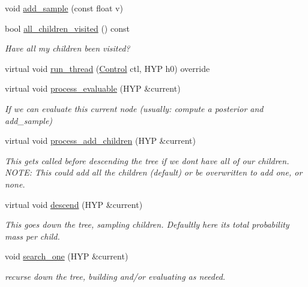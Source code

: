 \begin{DoxyCompactItemize}
\item 
void \hyperlink{class_full_m_c_t_s_node_a9c160f6b2732178bf7c2e32c125f4724}{add\+\_\+sample} (const float v)
\item 
bool \hyperlink{class_full_m_c_t_s_node_aea09f6d9b8a5adfe97c81f698b718560}{all\+\_\+children\+\_\+visited} () const
\begin{DoxyCompactList}\small\item\em Have all my children been visited? \end{DoxyCompactList}\item 
virtual void \hyperlink{class_full_m_c_t_s_node_acfdd0747aa1af7943995436a4aae1b26}{run\+\_\+thread} (\hyperlink{struct_control}{Control} ctl, H\+YP h0) override
\item 
virtual void \hyperlink{class_full_m_c_t_s_node_adc180cfd25b033b13ac048270fb51be7}{process\+\_\+evaluable} (H\+YP \&current)
\begin{DoxyCompactList}\small\item\em If we can evaluate this current node (usually\+: compute a posterior and add\+\_\+sample) \end{DoxyCompactList}\item 
virtual void \hyperlink{class_full_m_c_t_s_node_a10a7bbaae53e6b6ed71207ec80c1a620}{process\+\_\+add\+\_\+children} (H\+YP \&current)
\begin{DoxyCompactList}\small\item\em This gets called before descending the tree if we don\textquotesingle{}t have all of our children. N\+O\+TE\+: This could add all the children (default) or be overwritten to add one, or none. \end{DoxyCompactList}\item 
virtual void \hyperlink{class_full_m_c_t_s_node_ab5cf544f500703c9b8b46892a961ec32}{descend} (H\+YP \&current)
\begin{DoxyCompactList}\small\item\em This goes down the tree, sampling children. Defaultly here it\textquotesingle{}s total probability mass per child. \end{DoxyCompactList}\item 
void \hyperlink{class_full_m_c_t_s_node_a6996a784f6674edc7ac24fbc2b94d87a}{search\+\_\+one} (H\+YP \&current)
\begin{DoxyCompactList}\small\item\em recurse down the tree, building and/or evaluating as needed. \end{DoxyCompactList}\end{DoxyCompactItemize}

